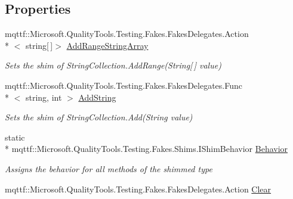 \subsection*{Properties}
\begin{DoxyCompactItemize}
\item 
mqttf\-::\-Microsoft.\-Quality\-Tools.\-Testing.\-Fakes.\-Fakes\-Delegates.\-Action\\*
$<$ string\mbox{[}$\,$\mbox{]}$>$ \hyperlink{class_system_1_1_collections_1_1_specialized_1_1_fakes_1_1_shim_string_collection_a7f79f54b87cd1e042186018d1fb49ece}{Add\-Range\-String\-Array}
\begin{DoxyCompactList}\small\item\em Sets the shim of String\-Collection.\-Add\-Range(\-String\mbox{[}$\,$\mbox{]} value)\end{DoxyCompactList}\item 
mqttf\-::\-Microsoft.\-Quality\-Tools.\-Testing.\-Fakes.\-Fakes\-Delegates.\-Func\\*
$<$ string, int $>$ \hyperlink{class_system_1_1_collections_1_1_specialized_1_1_fakes_1_1_shim_string_collection_ad96d351cb71a49a83fb719f2323b7cc3}{Add\-String}
\begin{DoxyCompactList}\small\item\em Sets the shim of String\-Collection.\-Add(\-String value)\end{DoxyCompactList}\item 
static \\*
mqttf\-::\-Microsoft.\-Quality\-Tools.\-Testing.\-Fakes.\-Shims.\-I\-Shim\-Behavior \hyperlink{class_system_1_1_collections_1_1_specialized_1_1_fakes_1_1_shim_string_collection_a4e79435f39bae5e9add02a591125acab}{Behavior}
\begin{DoxyCompactList}\small\item\em Assigns the behavior for all methods of the shimmed type\end{DoxyCompactList}\item 
mqttf\-::\-Microsoft.\-Quality\-Tools.\-Testing.\-Fakes.\-Fakes\-Delegates.\-Action \hyperlink{class_system_1_1_collections_1_1_specialized_1_1_fakes_1_1_shim_string_collection_a8ee276360bab898232a6589edbec2303}{Clear}

\end{DoxyCompactItemize}
